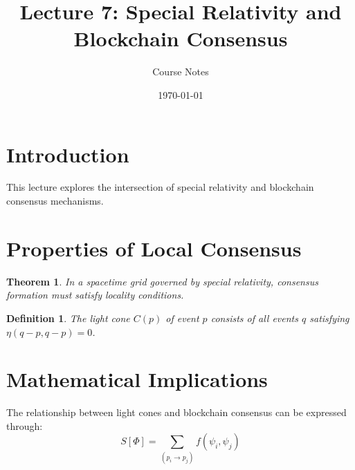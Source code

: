 \documentclass{article}
\newtheorem{theorem}{Theorem}
\newtheorem{definition}{Definition}
\begin{document}
\title{Lecture 7: Special Relativity and Blockchain Consensus}
\author{Course Notes}
\date{\today}
\maketitle

\section{Introduction}
This lecture explores the intersection of special relativity and blockchain consensus mechanisms.

\section{Properties of Local Consensus}
\begin{theorem}
In a spacetime grid governed by special relativity, consensus formation must satisfy locality conditions.
\end{theorem}

\begin{definition}
The light cone $C(p)$ of event $p$ consists of all events $q$ satisfying $\eta(q-p,q-p)=0$.
\end{definition}

\section{Mathematical Implications}
The relationship between light cones and blockchain consensus can be expressed through:
\[ S[\Phi] = \sum_{(p_i \to p_j)} f(\psi_i, \psi_j) \]
\end{document}
